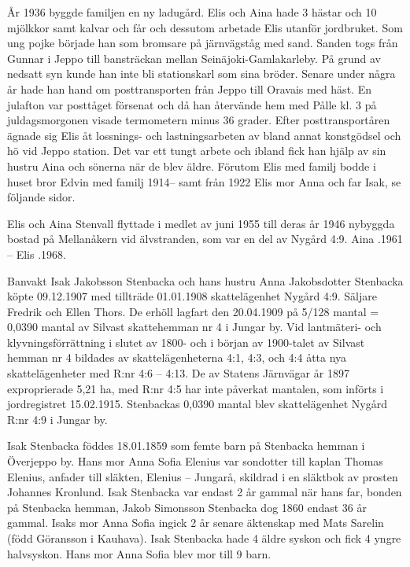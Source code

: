 År 1936 byggde familjen en ny ladugård. Elis och Aina hade 3 hästar och 10 mjölkkor samt kalvar och får och dessutom arbetade Elis utanför jordbruket. Som ung pojke började han som bromsare på järnvägståg med sand. Sanden togs från Gunnar i Jeppo till bansträckan mellan Seinäjoki-Gamlakarleby. På grund av nedsatt syn kunde han inte bli stationskarl som sina bröder. Senare under några år hade han hand om posttransporten från Jeppo till Oravais med häst. En julafton var posttåget försenat och då han återvände hem med Pålle kl. 3 på juldagsmorgonen visade termometern minus 36 grader.  Efter posttransportåren ägnade sig Elis åt lossnings- och lastningsarbeten av bland annat konstgödsel och hö vid Jeppo station. Det var ett tungt arbete och ibland fick han hjälp av sin hustru Aina och sönerna när de blev äldre.
Förutom Elis med familj bodde i huset bror Edvin med familj 1914-- samt från 1922 Elis mor Anna och far Isak, se följande sidor.

Elis och Aina Stenvall flyttade i medlet av juni 1955 till deras år 1946 nybyggda bostad på Mellanåkern vid älvstranden, som var en del av Nygård 4:9. Aina .1961  --  Elis .1968.


Banvakt Isak Jakobsson Stenbacka och hans hustru Anna Jakobsdotter Stenbacka köpte 09.12.1907 med tillträde 01.01.1908 skattelägenhet Nygård 4:9. Säljare Fredrik och Ellen Thors. De erhöll lagfart den 20.04.1909 på 5/128 mantal = 0,0390 mantal av Silvast skattehemman nr 4 i Jungar by. Vid lantmäteri- och klyvningsförrättning i slutet av 1800- och i början av 1900-talet av Silvast hemman nr 4 bildades av skattelägenheterna 4:1, 4:3, och 4:4  åtta nya skattelägenheter med R:nr 4:6 – 4:13. De av Statens Järnvägar år 1897 exproprierade 5,21 ha, med R:nr 4:5 har inte påverkat mantalen, som införts i jordregistret 15.02.1915. Stenbackas 0,0390 mantal blev skattelägenhet Nygård R:nr 4:9 i Jungar by.

Isak Stenbacka föddes 18.01.1859 som femte barn på Stenbacka hemman i Överjeppo by. Hans mor Anna Sofia Elenius var sondotter till kaplan Thomas Elenius, anfader till släkten, Elenius – Jungarå, skildrad i en släktbok av prosten Johannes Kronlund. Isak Stenbacka var endast 2 år gammal när hans far, bonden på Stenbacka hemman, Jakob Simonsson Stenbacka dog 1860 endast 36 år gammal. Isaks mor Anna Sofia ingick 2 år senare äktenskap med Mats Sarelin (född Göransson i Kauhava). Isak Stenbacka hade 4 äldre syskon och fick 4 yngre halvsyskon. Hans mor Anna Sofia blev mor till 9 barn.

